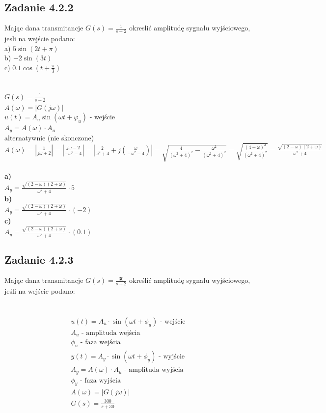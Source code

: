 \pagebreak
\subsection*{Zadanie 4.2.2} {\color{darkgray}
	Mając dana transmitancje $G(s)=\frac{1}{s+2}$ okreslić amplitudę sygnału wyjściowego, jesli na wejście podano:\\
	a) $5\sin(2t+ \pi)$\\
	b) $-2\sin(3t)$\\
	c) $0.1\cos(t+\frac\pi 3)$\\
}\lineh
\\\\
$G(s)=\frac{1}{s+2}$\\
$A(\omega)=|G(j\omega)|$\\
$u(t)=A_u\sin(\omega t+\varphi_u )$ - wejście\\
$A_y=A(\omega) \cdot A_u$\\
alternatywnie (nie skonczone)\\
{\color{lightgray}
$A(\omega)=|\frac1{j\omega+2}|=|\frac{j\omega-2}{-\omega^2-4}|=|\frac2{\omega^2+4}+j(\frac{\omega}{-\omega^2-4})|=\sqrt{\frac{4}{(\omega^2+4)^2}-\frac{\omega^2}{(\omega^2+4)^2}}=\sqrt{\frac{(4-\omega)^2}{(\omega^2+4)^2}}=\frac{\sqrt{(2-\omega)(2+\omega)}}{\omega^2+4}$\\
\\
\textbf{a)}\\
$A_y=\frac{\sqrt{(2-\omega)(2+\omega)}}{\omega^2+4} \cdot 5$\\
\textbf{b)}\\
$A_y=\frac{\sqrt{(2-\omega)(2+\omega)}}{\omega^2+4} \cdot (-2)$\\
\textbf{c)}\\
$A_y=\frac{\sqrt{(2-\omega)(2+\omega)}}{\omega^2+4} \cdot (0.1)$\\
}


\pagebreak
\subsection*{Zadanie 4.2.3} {\color{darkgray}
	Mając dana transmitancje $G(s)=\frac{30}{s+2}$ określić amplitudę sygnału wyjściowego, jeśli na wejście podano:\\
}\lineh
\\\\
\begin{gather*}
u(t) = A_u \cdot \sin{(\omega t+\phi_u)}\text{ - wejście} \\
A_u \text{ - amplituda wejścia} \\
\phi_u \text{ - faza wejścia} \\
y(t) = A_y \cdot \sin{(\omega t+\phi_y)}\text{ - wyjście} \\
A_y = A(\omega) \cdot A_u \text{ - amplituda wyjścia} \\
\phi_y \text{ - faza wyjścia} \\
A(\omega) = |G(j\omega)| \\
G(s) = \frac{300}{s+30}
\end{gather*}


